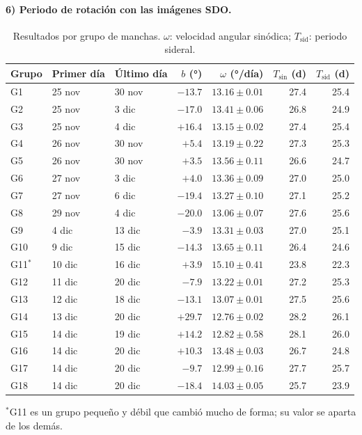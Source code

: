 \documentclass[11pt,a4paper]{article}
\begin{document}
\paragraph{6) Periodo de rotación con las imágenes SDO.}
\begin{table}[H]
\centering
\caption{Resultados por grupo de manchas. $\omega$: velocidad angular sinódica; $T_{\text{sid}}$: periodo sideral.}
\label{tab:grupos}
\small
\begin{tabular}{lllrrrr}
\toprule
Grupo & Primer día & Último día & $b$ (°) & $\omega$ (°/día) & $T_{\text{sin}}$ (d) & $T_{\text{sid}}$ (d) \\
\midrule
G1  & 25 nov & 30 nov & $-13.7$ & $13.16 \pm 0.01$ & 27.4 & 25.4 \\
G2  & 25 nov & 3 dic  & $-17.0$ & $13.41 \pm 0.06$ & 26.8 & 24.9 \\
G3  & 25 nov & 4 dic  & $+16.4$ & $13.15 \pm 0.02$ & 27.4 & 25.4 \\
G4  & 26 nov & 30 nov & $+5.4$  & $13.19 \pm 0.22$ & 27.3 & 25.3 \\
G5  & 26 nov & 30 nov & $+3.5$  & $13.56 \pm 0.11$ & 26.6 & 24.7 \\
G6  & 27 nov & 3 dic  & $+4.0$  & $13.36 \pm 0.09$ & 27.0 & 25.0 \\
G7  & 27 nov & 6 dic  & $-19.4$ & $13.27 \pm 0.10$ & 27.1 & 25.2 \\
G8  & 29 nov & 4 dic  & $-20.0$ & $13.06 \pm 0.07$ & 27.6 & 25.6 \\
G9  & 4 dic  & 13 dic & $-3.9$  & $13.31 \pm 0.03$ & 27.0 & 25.1 \\
G10 & 9 dic  & 15 dic & $-14.3$ & $13.65 \pm 0.11$ & 26.4 & 24.6 \\
G11$^*$ & 10 dic & 16 dic & $+3.9$ & $15.10 \pm 0.41$ & 23.8 & 22.3 \\
G12 & 11 dic & 20 dic & $-7.9$  & $13.22 \pm 0.01$ & 27.2 & 25.3 \\
G13 & 12 dic & 18 dic & $-13.1$ & $13.07 \pm 0.01$ & 27.5 & 25.6 \\
G14 & 13 dic & 20 dic & $+29.7$ & $12.76 \pm 0.02$ & 28.2 & 26.1 \\
G15 & 14 dic & 19 dic & $+14.2$ & $12.82 \pm 0.58$ & 28.1 & 26.0 \\
G16 & 14 dic & 20 dic & $+10.3$ & $13.48 \pm 0.03$ & 26.7 & 24.8 \\
G17 & 14 dic & 20 dic & $-9.7$  & $12.99 \pm 0.16$ & 27.7 & 25.7 \\
G18 & 14 dic & 20 dic & $-18.4$ & $14.03 \pm 0.05$ & 25.7 & 23.9 \\
\bottomrule
\end{tabular}

\smallskip
\footnotesize $^*$G11 es un grupo pequeño y débil que cambió mucho de forma; su valor se aparta de los demás.
\end{table}
\end{document}
